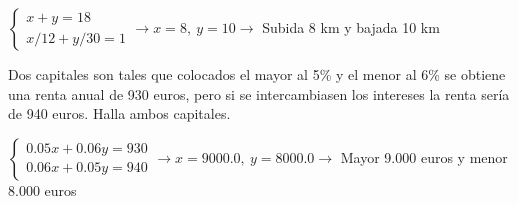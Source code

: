 \documentclass[spanish, 12pt]{exam}
\begin{document}
\begin{questions}
\begin{solution} $\left\{\begin{matrix}x+y=18 \\ x/12+y/30=1\end{matrix}\right. \to  x = 8, \  y = 10 \to $ Subida 8 km y bajada 10 km \end{solution}

\question Dos capitales son tales que colocados el mayor al 5\% y el menor al 6\% se obtiene una renta anual de 930 euros, pero si se intercambiasen los intereses la renta sería de 940 euros. Halla ambos capitales.
\begin{solution} $\left\{\begin{matrix}0.05x+0.06y=930 \\ 0.06x+0.05y=940\end{matrix}\right. \to  x = 9000.0, \  y = 8000.0 \to $ Mayor 9.000 euros y menor 8.000 euros \end{solution}

\end{questions}
\end{document}
